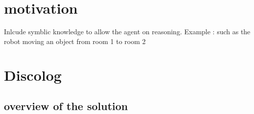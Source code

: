 \documentclass[conference]{IEEEtran}
\begin{document}
 
%
\section{motivation}

	Inlcude symblic knowledge to allow the agent on reasoning. 
	Example : such as the robot moving an object from room 1 to room 2 
	\section{Discolog}
	\subsection{overview of the solution}
		
\end{document}
